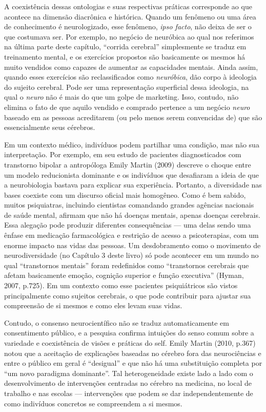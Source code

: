 A coexistência dessas ontologias e suas respectivas práticas corresponde
ao que acontece na dimensão diacrônica e histórica. Quando um fenômeno
ou uma área de conhecimento é neurologizado, esse fenômeno, \emph{ipso
facto}, não deixa de ser o que costumava ser. Por exemplo, no negócio de
neuróbica ao qual nos referimos na última parte deste capítulo,
``corrida cerebral'' simplesmente se traduz em treinamento mental, e os
exercícios propostos são basicamente os mesmos há muito vendidos como
capazes de aumentar as capacidades mentais. Ainda assim, quando esses
exercícios são reclassificados como \emph{neuróbica}, dão corpo à
ideologia do sujeito cerebral. Pode ser uma representação superficial
dessa ideologia, na qual o \emph{neuro} não é mais do que um golpe de
marketing. Isso, contudo, não elimina o fato de que aquilo vendido e
comprado pertence a um negócio \emph{neuro} baseado em as pessoas
acreditarem (ou pelo menos serem convencidas de) que são essencialmente
seus cérebros.

Em um contexto médico, indivíduos podem partilhar uma condição, mas não
sua interpretação. Por exemplo, em seu estudo de pacientes
diagnosticados com transtorno bipolar a antropóloga Emily Martin (2009)
descreve o choque entre um modelo reducionista dominante e os indivíduos
que desafiaram a ideia de que a neurobiologia bastava para explicar sua
experiência. Portanto, a diversidade nas bases coexiste com um discurso
oficial mais homogêneo. Como é bem sabido, muitos psiquiatras, incluindo
cientistas comandando grandes agências nacionais de saúde mental,
afirmam que não há doenças mentais, apenas doenças cerebrais. Essa
alegação pode produzir diferentes consequências --- uma delas sendo uma
ênfase em medicação farmacológica e restrição de acesso a psicoterapias,
com um enorme impacto nas vidas das pessoas. Um desdobramento como o
movimento de neurodiversidade (no Capítulo 3 deste livro) só pode
acontecer em um mundo no qual ``transtornos mentais'' foram redefinidos
como ``transtornos cerebrais que afetam basicamente emoção, cognição
superior e função executiva'' (Hyman, 2007, p.725). Em um contexto como
esse pacientes psiquiátricos são vistos principalmente como sujeitos
cerebrais, o que pode contribuir para ajustar sua compreensão de si
mesmos e como eles levam suas vidas.

Contudo, o consenso neurocientífico não se traduz automaticamente em
consentimento público, e a pesquisa confirma intuições do senso comum
sobre a variedade e coexistência de visões e práticas do self. Emily
Martin (2010, p.367) notou que a aceitação de explicações baseadas no
cérebro fora das neurociências e entre o público em geral é ``desigual''
e que não há uma substituição completa por ``um novo paradigma
dominante''. Tal heterogeneidade existe lado a lado com o
desenvolvimento de intervenções centradas no cérebro na medicina, no
local de trabalho e nas escolas --- intervenções que podem se dar
independentemente de como indivíduos concretos se compreendem a si
mesmos.

